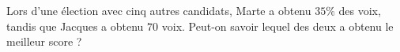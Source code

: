 
\begin{exercice}\label{exosmath-0797}

Lors d'une élection avec cinq autres candidats, Marte a obtenu $35 \%$ des voix, tandis que Jacques a obtenu $70$ voix. Peut-on savoir lequel des deux a obtenu le meilleur score ?

\end{exercice}

